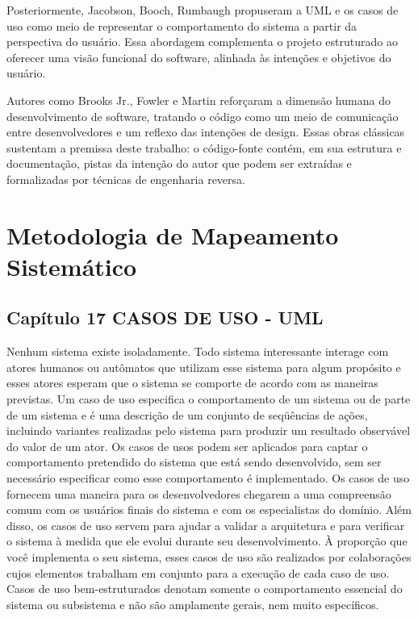 \documentclass[12pt,a4paper]{article}
\begin{document}
Posteriormente, Jacobson, Booch, Rumbaugh propuseram a UML e os casos de uso como meio de representar o comportamento do sistema a partir da perspectiva do usuário. Essa abordagem complementa o projeto estruturado ao oferecer uma visão funcional do software, alinhada às intenções e objetivos do usuário.

Autores como Brooks Jr., Fowler e Martin reforçaram a dimensão humana do desenvolvimento de software, tratando o código como um meio de comunicação entre desenvolvedores e um reflexo das intenções de design. Essas obras clássicas sustentam a premissa deste trabalho: o código-fonte contém, em sua estrutura e documentação, pistas da intenção do autor que podem ser extraídas e formalizadas por técnicas de engenharia reversa.



\section{Metodologia de Mapeamento Sistemático}
\subsection{Capítulo 17
CASOS DE USO - UML}
Nenhum sistema existe isoladamente. Todo sistema interessante interage
com atores humanos ou autômatos que utilizam esse sistema para algum propósito e esses atores esperam que o sistema se comporte de acordo com as maneiras previstas. Um caso de uso especifica o comportamento de um sistema ou de
parte de um sistema e é uma descrição de um conjunto de seqüências de ações,
incluindo variantes realizadas pelo sistema para produzir um resultado observável do valor de um ator.
Os casos de usos podem ser aplicados para captar o comportamento pretendido do sistema que está sendo desenvolvido, sem ser necessário especificar
como esse comportamento é implementado. Os casos de uso fornecem uma maneira para os desenvolvedores chegarem a uma compreensão comum com os
usuários finais do sistema e com os especialistas do domínio. Além disso, os casos de uso servem para ajudar a validar a arquitetura e para verificar o sistema à
medida que ele evolui durante seu desenvolvimento. À proporção que você implementa o seu sistema, esses casos de uso são realizados por colaborações cujos
elementos trabalham em conjunto para a execução de cada caso de uso.
Casos de uso bem-estruturados denotam somente o comportamento essencial do sistema ou subsistema e não são amplamente gerais, nem muito específicos.
\end{document}
